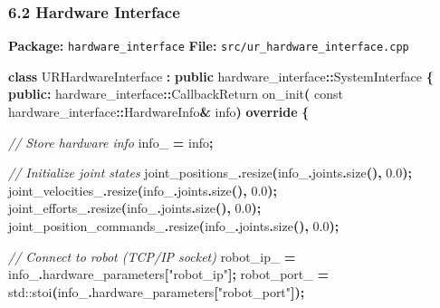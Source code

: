 \documentclass[
]{article}
\newenvironment{Shaded}{\begin{snugshade}}{\end{snugshade}}
\newcommand{\AttributeTok}[1]{\textcolor[rgb]{0.13,0.29,0.53}{#1}}
\newcommand{\BuiltInTok}[1]{#1}
\newcommand{\CommentTok}[1]{\textcolor[rgb]{0.56,0.35,0.01}{\textit{#1}}}
\newcommand{\FloatTok}[1]{\textcolor[rgb]{0.00,0.00,0.81}{#1}}
\newcommand{\KeywordTok}[1]{\textcolor[rgb]{0.13,0.29,0.53}{\textbf{#1}}}
\newcommand{\NormalTok}[1]{#1}
\newcommand{\OperatorTok}[1]{\textcolor[rgb]{0.81,0.36,0.00}{\textbf{#1}}}
\newcommand{\StringTok}[1]{\textcolor[rgb]{0.31,0.60,0.02}{#1}}
\newcommand{\VariableTok}[1]{\textcolor[rgb]{0.00,0.00,0.00}{#1}}
\begin{document}
\hypertarget{hardware-interface}{%
\subsubsection{6.2 Hardware Interface}\label{hardware-interface}}

\textbf{Package:} \texttt{hardware\_interface} \textbf{File:}
\texttt{src/ur\_hardware\_interface.cpp}

\begin{Shaded}
\begin{Highlighting}[]
\KeywordTok{class}\NormalTok{ URHardwareInterface }\OperatorTok{:} \KeywordTok{public}\NormalTok{ hardware\_interface}\OperatorTok{::}\NormalTok{SystemInterface }\OperatorTok{\{}
\KeywordTok{public}\OperatorTok{:}
\NormalTok{    hardware\_interface}\OperatorTok{::}\NormalTok{CallbackReturn on\_init}\OperatorTok{(}
        \AttributeTok{const}\NormalTok{ hardware\_interface}\OperatorTok{::}\NormalTok{HardwareInfo}\OperatorTok{\&}\NormalTok{ info}\OperatorTok{)} \KeywordTok{override} \OperatorTok{\{}

        \CommentTok{// Store hardware info}
        \VariableTok{info\_} \OperatorTok{=}\NormalTok{ info}\OperatorTok{;}

        \CommentTok{// Initialize joint states}
        \VariableTok{joint\_positions\_}\OperatorTok{.}\NormalTok{resize}\OperatorTok{(}\VariableTok{info\_}\OperatorTok{.}\NormalTok{joints}\OperatorTok{.}\NormalTok{size}\OperatorTok{(),} \FloatTok{0.0}\OperatorTok{);}
        \VariableTok{joint\_velocities\_}\OperatorTok{.}\NormalTok{resize}\OperatorTok{(}\VariableTok{info\_}\OperatorTok{.}\NormalTok{joints}\OperatorTok{.}\NormalTok{size}\OperatorTok{(),} \FloatTok{0.0}\OperatorTok{);}
        \VariableTok{joint\_efforts\_}\OperatorTok{.}\NormalTok{resize}\OperatorTok{(}\VariableTok{info\_}\OperatorTok{.}\NormalTok{joints}\OperatorTok{.}\NormalTok{size}\OperatorTok{(),} \FloatTok{0.0}\OperatorTok{);}
        \VariableTok{joint\_position\_commands\_}\OperatorTok{.}\NormalTok{resize}\OperatorTok{(}\VariableTok{info\_}\OperatorTok{.}\NormalTok{joints}\OperatorTok{.}\NormalTok{size}\OperatorTok{(),} \FloatTok{0.0}\OperatorTok{);}

        \CommentTok{// Connect to robot (TCP/IP socket)}
        \VariableTok{robot\_ip\_} \OperatorTok{=} \VariableTok{info\_}\OperatorTok{.}\NormalTok{hardware\_parameters}\OperatorTok{[}\StringTok{"robot\_ip"}\OperatorTok{];}
        \VariableTok{robot\_port\_} \OperatorTok{=} \BuiltInTok{std::}\NormalTok{stoi}\OperatorTok{(}\VariableTok{info\_}\OperatorTok{.}\NormalTok{hardware\_parameters}\OperatorTok{[}\StringTok{"robot\_port"}\OperatorTok{]);}


\end{Highlighting}
\end{Shaded}
\end{document}
